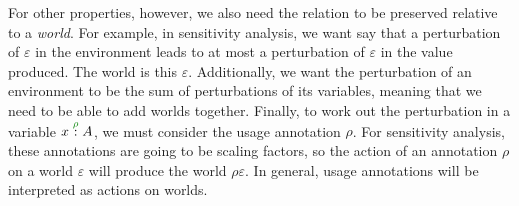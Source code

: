 For other properties, however, we also need the relation to be preserved
relative to a \emph{world}.
For example, in sensitivity analysis, we want say that a perturbation of
$\varepsilon$ in the environment leads to at most a perturbation of
$\varepsilon$ in the value produced.
The world is this $\varepsilon$.
Additionally, we want the perturbation of an environment to be the sum of
perturbations of its variables, meaning that we need to be able to add worlds
together.
Finally, to work out the perturbation in a variable $\ctxvar{x}{A}{\rho}$, we
must consider the usage annotation $\rho$.
For sensitivity analysis, these annotations are going to be scaling factors, so
the action of an annotation $\rho$ on a world $\varepsilon$ will produce the
world $\rho\varepsilon$.
In general, usage annotations will be interpreted as actions on worlds.

